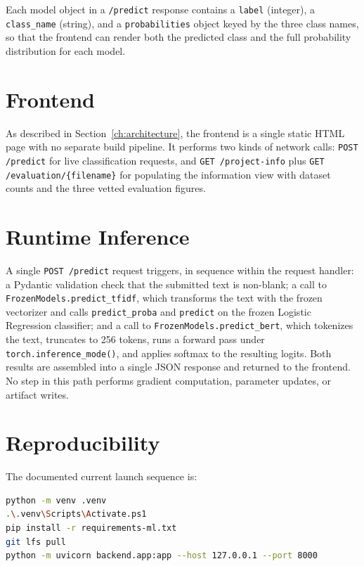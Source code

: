 Each model object in a \texttt{/\pbrk predict} response contains a \texttt{label} (integer), a \texttt{class\_name} (string), and a \texttt{probabilities} object keyed by the three class names, so that the frontend can render both the predicted class and the full probability distribution for each model.

\section{Frontend}

As described in Section~\ref{ch:architecture}, the frontend is a single static HTML page with no separate build pipeline. It performs two kinds of network calls: \texttt{POST /\pbrk predict} for live classification requests, and \texttt{GET /\pbrk project-info} plus \texttt{GET /\pbrk evaluation/\pbrk \{filename\}} for populating the information view with dataset counts and the three vetted evaluation figures.

\section{Runtime Inference}

A single \texttt{POST /\pbrk predict} request triggers, in sequence within the request handler: a Pydantic validation check that the submitted text is non-blank; a call to \texttt{FrozenModels.predict\_\pbrk tfidf}, which transforms the text with the frozen vectorizer and calls \texttt{predict\_proba} and \texttt{predict} on the frozen Logistic Regression classifier; and a call to \texttt{FrozenModels.predict\_\pbrk bert}, which tokenizes the text, truncates to 256 tokens, runs a forward pass under \texttt{torch.inference\_\pbrk mode()}, and applies softmax to the resulting logits. Both results are assembled into a single JSON response and returned to the frontend. No step in this path performs gradient computation, parameter updates, or artifact writes.

\section{Reproducibility}
\label{sec:reproducibility}

The documented current launch sequence is:

\begin{lstlisting}[language=bash]
python -m venv .venv
.\.venv\Scripts\Activate.ps1
pip install -r requirements-ml.txt
git lfs pull
python -m uvicorn backend.app:app --host 127.0.0.1 --port 8000
\end{lstlisting}

